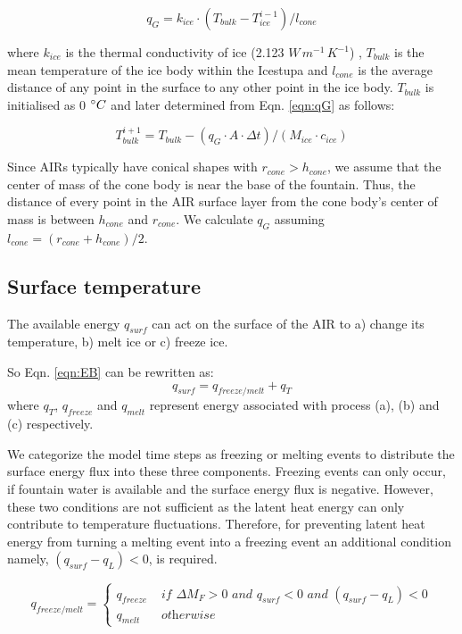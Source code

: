 \documentclass[utf8]{frontiersSCNS} %
\begin{document}
\begin{equation} q_{G} = k_{ice} \cdot (T_{bulk}-T_{ice}^{i-1})/l_{cone} \label{eqn:qG}    \end{equation}

where $k_{ice}$ is the thermal conductivity of ice (2.123 $W\, m^{-1}\,K^{-1}$) , $T_{bulk}$ is the mean
temperature of the ice body within the Icestupa and $l_{cone}$ is the average distance of any point in the
surface to any other point in the ice body. $T_{bulk}$ is initialised as 0 $\degree C$ and later determined from
Eqn. \ref{eqn:qG} as follows:

\begin{equation} T_{bulk}^{i+1} = T_{bulk} - (q_{G} \cdot A \cdot \Delta t)/(M_{ice} \cdot c_{ice}) \end{equation}

Since AIRs typically have conical shapes with $r_{cone} > h_{cone}$, we assume that the center of mass of the cone
body is near the base of the fountain. Thus, the distance of every point in the AIR surface layer from the cone
body's center of mass is between $h_{cone}$ and $r_{cone}$. We calculate $q_{G}$ assuming $l_{cone} = (r_{cone} +
	h_{cone})/2$.

\subsection{Surface temperature}

The available energy $q_{surf}$ can act on the surface of the AIR to a) change its temperature, b) melt ice or
c) freeze ice.

So Eqn. \ref{eqn:EB} can be rewritten as: \begin{equation} q_{surf} = q_{freeze/melt} + q_{T} \end{equation}
where $q_{T}$, $q_{freeze}$ and $q_{melt}$ represent energy associated with process (a), (b) and (c)
respectively.

We categorize the model time steps as freezing or melting events to distribute the surface energy flux into
these three components. Freezing events can only occur, if fountain water is available and the surface energy
flux is negative. However, these two conditions are not sufficient as the latent heat energy can only contribute
to temperature fluctuations. Therefore, for preventing latent heat energy from turning a melting event into a
freezing event an additional condition namely, $(q_{surf}-q_{L}) < 0$, is required.

\begin{equation}
	q_{freeze/melt} = \left\{ \begin{array}{ll}
		q_{freeze} & \textit{ if } \Delta M_{F} > 0 \textit{ and } q_{surf} < 0 \textit{ and }(q_{surf}-q_{L}) < 0 \\
		q_{melt}   & \textit{ otherwise}
	\end{array} \right.
\end{equation}
\end{document}
